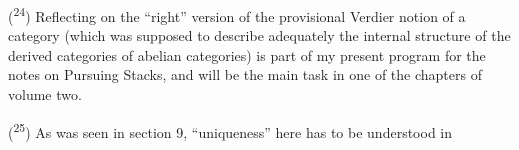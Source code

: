 (\textsuperscript{24}) Reflecting on the ``right'' version of the provisional Verdier notion of a  category (which was supposed to describe adequately the  internal structure of the derived categories of abelian categories) is part of my present program for the notes on Pursuing Stacks, and will be the main task in one of the chapters of volume two.

(\textsuperscript{25}) As was seen in section 9, ``uniqueness'' here has to be understood in
